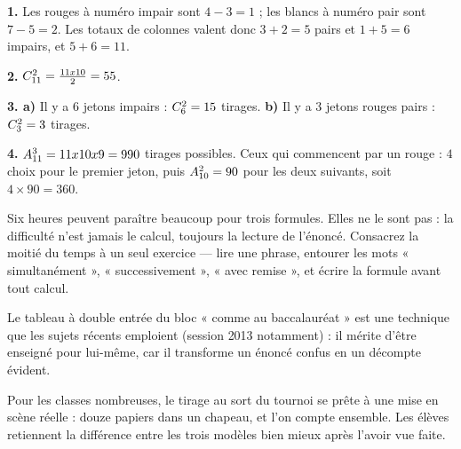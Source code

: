 \begin{corrige}
\textbf{1.} Les rouges à numéro impair sont $4-3 = 1$ ; les blancs à numéro
pair sont $7-5 = 2$. Les totaux de colonnes valent donc $3+2 = 5$ pairs et
$1+5 = 6$ impairs, et $5+6 = 11$. \checkmark

\textbf{2.} $\combi{2}{11} = \frac{11\times10}{2} = 55$.

\textbf{3. a)} Il y a $6$ jetons impairs : $\combi{2}{6} = 15$ tirages.
\textbf{b)} Il y a $3$ jetons rouges pairs : $\combi{2}{3} = 3$ tirages.

\textbf{4.} $\arrang{3}{11} = 11\times10\times9 = 990$ tirages possibles.
Ceux qui commencent par un rouge : $4$ choix pour le premier jeton, puis
$\arrang{2}{10} = 90$ pour les deux suivants, soit $4\times90 = 360$.
\end{corrige}

\begin{notepourlaclasse}
Six heures peuvent paraître beaucoup pour trois formules. Elles ne le sont
pas : la difficulté n'est jamais le calcul, toujours la lecture de l'énoncé.
Consacrez la moitié du temps à un seul exercice — lire une phrase, entourer
les mots « simultanément », « successivement », « avec remise », et écrire
la formule avant tout calcul.

Le tableau à double entrée du bloc « comme au baccalauréat » est une
technique que les sujets récents emploient (session 2013 notamment) : il
mérite d'être enseigné pour lui-même, car il transforme un énoncé confus en
un décompte évident.

Pour les classes nombreuses, le tirage au sort du tournoi se prête à une
mise en scène réelle : douze papiers dans un chapeau, et l'on compte
ensemble. Les élèves retiennent la différence entre les trois modèles bien
mieux après l'avoir vue faite.
\end{notepourlaclasse}
